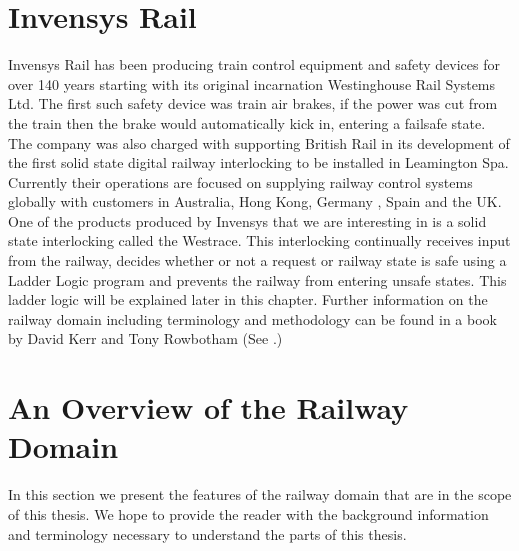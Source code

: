 \section{Invensys Rail}

Invensys Rail \cite{Inven} has been producing train control equipment and safety devices for over 140 years starting with its original incarnation Westinghouse Rail Systems Ltd. 
The first such safety device was train air brakes, if the power was cut from the train then the brake would automatically kick in, entering a failsafe state. The company was also charged with supporting British Rail in its development of the first solid state digital railway interlocking to be installed in Leamington Spa. Currently their operations are focused on supplying railway control systems globally with customers in Australia, Hong Kong, Germany , Spain and the UK. One of the products produced by Invensys that we are interesting in is  a solid state interlocking called the Westrace. This interlocking continually receives input from the railway, decides whether or not a request or railway state is safe using a Ladder Logic program and prevents the railway from entering unsafe states. This ladder logic will be explained later in this chapter. Further information on the railway domain including terminology and methodology can be found in a book by David Kerr and Tony Rowbotham (See \cite{KR01}.)
\begin{comment}

Originally they produced air brakes for trains, these had a
failsafe state such that if the power was cut the brakes would automatically stop the train.
Later on in the company's development they provided support to British Rail
when the first solid state digital railway interlocking was installed in
Leamington Spa. Today they supply railway control equipment to companies based
around the globe, including companies based in Australia, Hong Kong,
Germany, Spain and the UK. This project is mainly concerned with one of the
solid state railway interlockings Invensys produces called the Westrace. The
Westrace railway interlocking continuously runs a ladder logic program which
prevents the railway control systems from entering a dangerous state. Ladder
logic will be explained in a later chapter.
David Kerr and Tony Rowbotham  produced a book that explains the
terminology and methodology used in the railway industry and by
Invensys (See \cite{KR01}).  
\end{comment}
\section{An Overview of the Railway Domain} 
In this section we present the features of the railway domain that are in
the scope of this thesis. We hope to provide the reader with the background
information and terminology necessary to understand the parts of this thesis.


